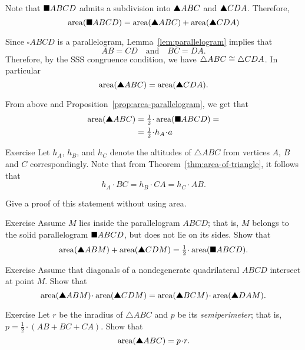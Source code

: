 Note that $\blacksquare ABCD$ admits a subdivision into $\solidtriangle ABC$ and $\solidtriangle CDA$.
Therefore, 
\[\area(\solidsquare ABCD)
=
\area(\solidtriangle ABC)
+
\area(\solidtriangle CDA)\]

Since $\square ABCD$ is a parallelogram,  Lemma~\ref{lem:parallelogram} implies that
\[AB=CD
\quad
\text{and}
\quad
BC=DA.\]
Therefore, by the SSS congruence condition, we have
$\triangle ABC\z\cong\triangle CDA$.
In particular
\[\area(\solidtriangle ABC)
=
\area(\solidtriangle CDA).\]

From above and Proposition~\ref{prop:area-parallelogram}, we get that
\begin{align*}
\area(\solidtriangle ABC)
&=\tfrac12\cdot\area(\solidsquare ABCD)=
\\
&=\tfrac12\cdot h_A\cdot a
\end{align*}
\qedsf

\begin{thm}{Exercise}\label{ex:three-trig}
Let $h_A$, $h_B$, and $h_C$ denote the altitudes of $\triangle ABC$ from vertices $A$, $B$ and $C$ correspondingly.
Note that from Theorem~\ref{thm:area-of-triangle},
it follows that
\[h_A\cdot BC=h_B\cdot CA=h_C\cdot AB.\]

Give a proof of this statement without using area.
\end{thm}

\begin{thm}{Exercise}\label{ex:half-parallelogram}
Assume $M$ lies inside the parallelogram $ABCD$;
that is, $M$ belongs to the solid parallelogram $\blacksquare ABCD$, but does not lie on its sides.
Show that
\[\area(\solidtriangle ABM)+\area(\solidtriangle CDM)
=\tfrac12\cdot \area(\solidsquare ABCD).\]
\end{thm}


\begin{thm}{Exercise}\label{ex:area-diag}
Assume that diagonals 
of a nondegenerate quadrilateral $ABCD$ 
intersect at point $M$.
Show that 
\[\area(\solidtriangle ABM)\cdot\area(\solidtriangle CDM)
=
\area(\solidtriangle BCM)\cdot\area(\solidtriangle DAM).\]
 
\end{thm}

\begin{thm}{Exercise}\label{ex:area-inradius}
Let $r$ be the inradius of $\triangle ABC$
and $p$ be its {}\emph{semiperimeter}; 
that is, $p=\tfrac12\cdot(AB+BC+CA)$.
Show that
\[\area(\solidtriangle ABC)=p\cdot r.\]

\end{thm}

